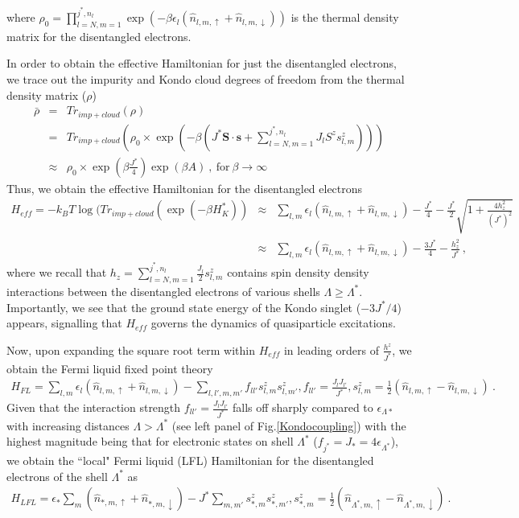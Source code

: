 \documentclass[aps,prb,preprint,groupedaddress]{revtex4-2}
\begin{document}
where $\rho_{0}= \prod_{l=N,m=1}^{j^{*},n_{l}}\exp(-\beta\epsilon_{l}(\hat{n}_{l,m,\uparrow}+\hat{n}_{l,m,\downarrow}))$ is the thermal density matrix for the disentangled electrons.
\par\noindent
In order to obtain the effective Hamiltonian for just the disentangled electrons, we trace out the impurity and Kondo cloud degrees of freedom from the thermal density matrix ($\rho$)
\begin{eqnarray}
\bar{\rho} &=& Tr_{imp+cloud}(\rho)\nonumber\\
&=&Tr_{imp+cloud}(\rho_{0}\times\exp(-\beta(J^{*}\mathbf{S}\cdot\mathbf{s}+\sum_{l=N,m=1}^{j^{*},n_{l}}J_{l}S^{z}s^{z}_{l,m})))\nonumber\\
&\approx &\rho_{0}\times\exp(\beta\frac{J^{*}}{4})\exp(\beta A)~,~ \text{for}~\beta\to \infty
\end{eqnarray}
Thus, we obtain the effective Hamiltonian for the disentangled electrons
\begin{eqnarray}
H_{eff}=-k_{B}T\log(Tr_{imp+cloud}(\exp(-\beta H^{*}_{K})) &\approx &\sum_{l,m}\epsilon_{l}(\hat{n}_{l,m,\uparrow}+\hat{n}_{l,m,\downarrow})-\frac{J^{*}}{4}-\frac{J^{*}}{2}\sqrt{1+\frac{4h_{z}^{2}}{(J^{*})^{2}}}\nonumber\\
&\approx &\sum_{l,m}\epsilon_{l}(\hat{n}_{l,m,\uparrow}+\hat{n}_{l,m,\downarrow})-\frac{3J^{*}}{4}-\frac{h^{2}_{z}}{J^{*}}~,
\end{eqnarray}
where we recall that $ h_{z}=\sum_{l=N,m=1}^{j^{*},n_{l}}\frac{J_{l}}{2}s^{z}_{l,m}$ contains spin density density interactions between the disentangled electrons of various shells $\Lambda\geq \Lambda^{*}$. Importantly, we see that the ground state energy of the Kondo singlet ($-3J^{*}/4$) appears, signalling that $H_{eff}$ governs the dynamics of quasiparticle excitations.
\par\noindent
Now, upon expanding the square root term within $H_{eff}$ in leading orders of $\frac{h^{z}}{J^{*}}$, we obtain the Fermi liquid fixed point theory
\begin{eqnarray}
H_{FL}=\sum_{l,m}\epsilon_{l}(\hat{n}_{l,m,\uparrow}+\hat{n}_{l,m,\downarrow})-\sum_{l,l',m,m'}f_{ll'}s^{z}_{l,m}s^{z}_{l,m'}, f_{ll'}=\frac{J_{l}J_{l'}}{J^{*}}, s^{z}_{l,m}=\frac{1}{2}(\hat{n}_{l,m,\uparrow}-\hat{n}_{l,m,\downarrow})~.
\end{eqnarray}
Given that the interaction strength $f_{ll'}=\frac{J_{l}J_{l'}}{J^{*}}$ falls off sharply compared to $\epsilon_{\Lambda*}$ with increasing distances $\Lambda>\Lambda^{*}$ (see left panel of Fig.\ref{Kondocoupling}) with the highest magnitude being that  for electronic states on shell $\Lambda^{*}$ ($f_{j^{*}}=J_{*}=4\epsilon_{\Lambda^{*}}$), we obtain the ``local" Fermi liquid (LFL) Hamiltonian for the disentangled electrons of the shell $\Lambda^{*}$ as
\begin{eqnarray}
H_{LFL}=\epsilon_{*}\sum_{m}(\hat{n}_{*,m,\uparrow}+\hat{n}_{*,m,\downarrow})-J^{*}\sum_{m,m'}s^{z}_{*,m}s^{z}_{*,m'}, s^{z}_{*,m}=\frac{1}{2}(\hat{n}_{\Lambda^{*},m,\uparrow}-\hat{n}_{\Lambda^{*},m,\downarrow})~.
\end{eqnarray}
\end{document}

